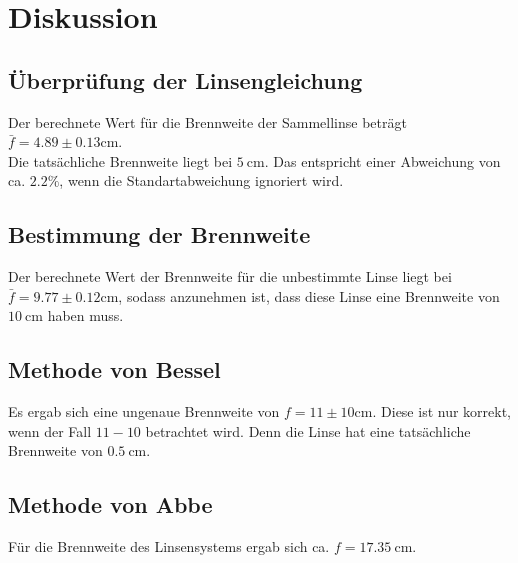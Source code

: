 \newpage
\section{Diskussion}
\label{sec:Diskussion}

\subsection{Überprüfung der Linsengleichung}
Der berechnete Wert für die Brennweite der Sammellinse beträgt $\bar{f} = 4.89\pm0.13\si{\centi\metre}$.\\
Die tatsächliche Brennweite liegt bei $\SI{5}{\centi\metre}$.
Das entspricht einer Abweichung von ca. $2.2 \%$, wenn die Standartabweichung ignoriert wird.

\subsection{Bestimmung der Brennweite}
Der berechnete Wert der Brennweite für die unbestimmte Linse liegt bei $\bar{f} = 9.77\pm0.12\si{\centi\metre}$,
sodass anzunehmen ist, dass diese Linse eine Brennweite von $\SI{10}{\centi\metre}$ haben muss.

\subsection{Methode von Bessel}
Es ergab sich eine ungenaue Brennweite von $f = 11\pm 10\si{\centi\metre}$. 
Diese ist nur korrekt, wenn der Fall $11-10$ betrachtet wird.
Denn die Linse hat eine tatsächliche Brennweite von $\SI{0.5}{\centi\metre}$.

\subsection{Methode von Abbe}
Für die Brennweite des Linsensystems ergab sich ca. $f = \SI{17.35}{\centi\metre}$.